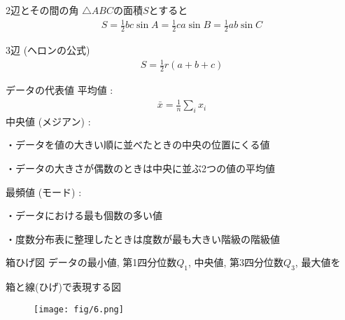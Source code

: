 \documentclass[aspectratio=169, 12pt]{beamer}
\begin{document}
\begin{frame}{2辺とその間の角}
    $\bigtriangleup ABC$の面積$S$とすると
    \begin{eqnarray*}
        S=\frac{1}{2}bc\sin A=\frac{1}{2}ca\sin B=\frac{1}{2}ab\sin C
    \end{eqnarray*}
\end{frame}
\begin{frame}{3辺 (ヘロンの公式)}
    \begin{eqnarray*}
        S=\frac{1}{2}r(a+b+c)
    \end{eqnarray*}
\end{frame}
\begin{frame}{データの代表値}
    平均値 :
    \begin{eqnarray*}
        \bar{x}=\frac{1}{n}\sum_i x_i
    \end{eqnarray*}
    中央値 (メジアン) : \par
    ・データを値の大きい順に並べたときの中央の位置にくる値\par
    ・データの大きさが偶数のときは中央に並ぶ2つの値の平均値\par
    最頻値 (モード) : \par
    ・データにおける最も個数の多い値 \par
    ・度数分布表に整理したときは度数が最も大きい階級の階級値
\end{frame}
\begin{frame}{箱ひげ図}
    データの最小値, 第1四分位数$Q_1$, 中央値, 第3四分位数$Q_3$, 最大値を\par
    箱と線(ひげ)で表現する図 \par
    \begin{figure}[htbp]
        \begin{center}
            \texttt{[image: fig/6.png]}
        \end{center}
    \end{figure}
\end{frame}
\end{document}
